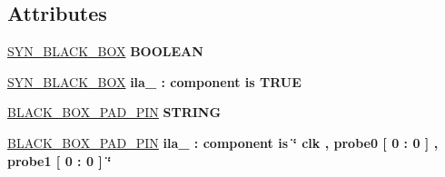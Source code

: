 \subsection*{Attributes}
 \begin{DoxyCompactItemize}
\item 
\hypertarget{classbutton__and__hex__wrapper_1_1rtl_a620a472e1e38a9a065c13709be3c3498}{\hyperlink{classbutton__and__hex__wrapper_1_1rtl_a620a472e1e38a9a065c13709be3c3498}{S\-Y\-N\-\_\-\-B\-L\-A\-C\-K\-\_\-\-B\-O\-X} {\bfseries \textcolor{comment}{B\-O\-O\-L\-E\-A\-N}\textcolor{vhdlchar}{ }} }\label{classbutton__and__hex__wrapper_1_1rtl_a620a472e1e38a9a065c13709be3c3498}

\item 
\hypertarget{classbutton__and__hex__wrapper_1_1rtl_acf7c548bd11c80b5393211fb97c4976c}{\hyperlink{classbutton__and__hex__wrapper_1_1rtl_acf7c548bd11c80b5393211fb97c4976c}{S\-Y\-N\-\_\-\-B\-L\-A\-C\-K\-\_\-\-B\-O\-X} {\bfseries \textcolor{vhdlchar}{ila\-\_}\textcolor{vhdlchar}{ }\textcolor{vhdlchar}{\-:}\textcolor{vhdlchar}{ }\textcolor{vhdlkeyword}{component}\textcolor{vhdlchar}{ }\textcolor{vhdlkeyword}{is}\textcolor{vhdlchar}{ }\textcolor{vhdlchar}{T\-R\-U\-E}\textcolor{vhdlchar}{ }} }\label{classbutton__and__hex__wrapper_1_1rtl_acf7c548bd11c80b5393211fb97c4976c}

\item 
\hypertarget{classbutton__and__hex__wrapper_1_1rtl_a85263acf3fd8cc44f8fccf0d7c5e1c7d}{\hyperlink{classbutton__and__hex__wrapper_1_1rtl_a85263acf3fd8cc44f8fccf0d7c5e1c7d}{B\-L\-A\-C\-K\-\_\-\-B\-O\-X\-\_\-\-P\-A\-D\-\_\-\-P\-I\-N} {\bfseries \textcolor{comment}{S\-T\-R\-I\-N\-G}\textcolor{vhdlchar}{ }} }\label{classbutton__and__hex__wrapper_1_1rtl_a85263acf3fd8cc44f8fccf0d7c5e1c7d}

\item 
\hypertarget{classbutton__and__hex__wrapper_1_1rtl_a6918630059cd7e207810f01e51d731fc}{\hyperlink{classbutton__and__hex__wrapper_1_1rtl_a6918630059cd7e207810f01e51d731fc}{B\-L\-A\-C\-K\-\_\-\-B\-O\-X\-\_\-\-P\-A\-D\-\_\-\-P\-I\-N} {\bfseries \textcolor{vhdlchar}{ila\-\_}\textcolor{vhdlchar}{ }\textcolor{vhdlchar}{\-:}\textcolor{vhdlchar}{ }\textcolor{vhdlkeyword}{component}\textcolor{vhdlchar}{ }\textcolor{vhdlkeyword}{is}\textcolor{vhdlchar}{ }\textcolor{keyword}{\char`\"{} clk , probe0 \mbox{[} 0 \-: 0 \mbox{]} , probe1 \mbox{[} 0 \-: 0 \mbox{]} \char`\"{}}\textcolor{vhdlchar}{ }} }\label{classbutton__and__hex__wrapper_1_1rtl_a6918630059cd7e207810f01e51d731fc}

\end{DoxyCompactItemize}
